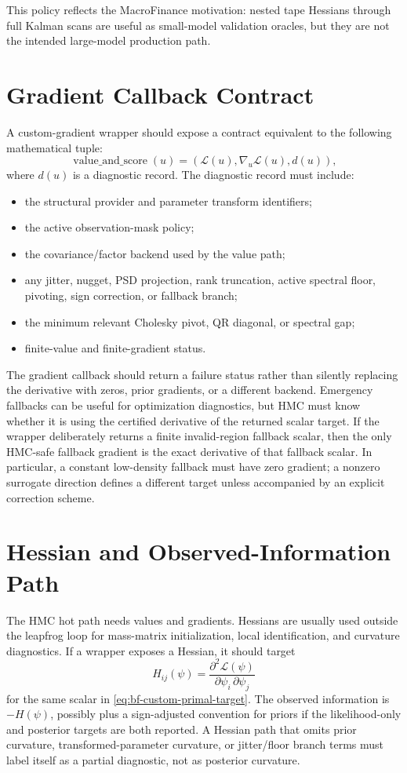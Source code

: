 This policy reflects the MacroFinance motivation: nested tape Hessians through
full Kalman scans are useful as small-model validation oracles, but they are not
the intended large-model production path.

\section{Gradient Callback Contract}
\label{sec:bf-custom-gradient-callback}

A custom-gradient wrapper should expose a contract equivalent to the following
mathematical tuple:
\[
  \operatorname{value\_and\_score}(u)
  =
  \left(
    \mathcal{L}(u),
    \nabla_u\mathcal{L}(u),
    d(u)
  \right),
\]
where $d(u)$ is a diagnostic record.  The diagnostic record must include:
\begin{itemize}
  \item the structural provider and parameter transform identifiers;
  \item the active observation-mask policy;
  \item the covariance/factor backend used by the value path;
  \item any jitter, nugget, PSD projection, rank truncation, active spectral
    floor, pivoting, sign correction, or fallback branch;
  \item the minimum relevant Cholesky pivot, QR diagonal, or spectral gap;
  \item finite-value and finite-gradient status.
\end{itemize}
The gradient callback should return a failure status rather than silently
replacing the derivative with zeros, prior gradients, or a different backend.
Emergency fallbacks can be useful for optimization diagnostics, but HMC must
know whether it is using the certified derivative of the returned scalar target.
If the wrapper deliberately returns a finite invalid-region fallback scalar, then
the only HMC-safe fallback gradient is the exact derivative of that fallback
scalar.  In particular, a constant low-density fallback must have zero gradient;
a nonzero surrogate direction defines a different target unless accompanied by an
explicit correction scheme.

\section{Hessian and Observed-Information Path}
\label{sec:bf-custom-gradient-hessian-path}

The HMC hot path needs values and gradients.  Hessians are usually used outside
the leapfrog loop for mass-matrix initialization, local identification, and
curvature diagnostics.  If a wrapper exposes a Hessian, it should target
\[
  H_{ij}(\psi)
  =
  \frac{\partial^2\mathcal{L}(\psi)}
       {\partial\psi_i\,\partial\psi_j}
\]
for the same scalar in \eqref{eq:bf-custom-primal-target}.  The observed
information is $-H(\psi)$, possibly plus a sign-adjusted convention for priors
if the likelihood-only and posterior targets are both reported.  A Hessian path
that omits prior curvature, transformed-parameter curvature, or jitter/floor
branch terms must label itself as a partial diagnostic, not as posterior
curvature.

